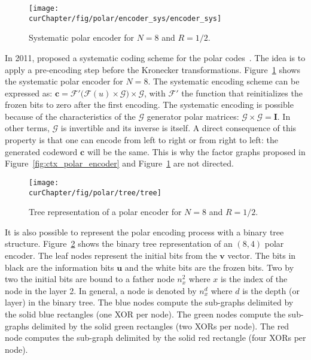 \begin{figure}[htp]
  \centering
  \texttt{[image: \\curChapter/fig/polar/encoder\_sys/encoder\_sys]}
  \caption{Systematic polar encoder for $N = 8$ and $R = 1/2$.}
  \label{fig:ctx_polar_encoder_sys}
\end{figure}

In 2011, \Arikan proposed a systematic coding scheme for the polar
codes~\cite{Arikan2011}. The idea is to apply a pre-encoding step before the
Kronecker transformations. Figure~\ref{fig:ctx_polar_encoder_sys} shows the
systematic polar encoder for $N = 8$. The systematic encoding scheme can be
expressed as: $\bm{c} = \mathcal{F'}\big(\mathcal{F}(u) \times
\bm{\mathcal{G}}\big) \times \bm{\mathcal{G}}$, with $\mathcal{F'}$ the function
that reinitializes the frozen bits to zero after the first encoding. The
systematic encoding is possible because of the characteristics of the
$\bm{\mathcal{G}}$ generator polar matrices: $\bm{\mathcal{G}} \times
\bm{\mathcal{G}} = \bm{I}$. In other terms, $\bm{\mathcal{G}}$ is invertible and
its inverse is itself. A direct consequence of this property is that one can
encode from left to right or from right to left: the generated codeword $\bm{c}$
will be the same. This is why the factor graphs proposed in
Figure~\ref{fig:ctx_polar_encoder} and Figure~\ref{fig:ctx_polar_encoder_sys}
are not directed.

\begin{figure}[htp]
  \centering
  \texttt{[image: \\curChapter/fig/polar/tree/tree]}
  \caption{Tree representation of a polar encoder for $N = 8$ and $R = 1/2$.}
  \label{fig:ctx_polar_tree}
\end{figure}

It is also possible to represent the polar encoding process with a binary tree
structure. Figure~\ref{fig:ctx_polar_tree} shows the binary tree representation
of an $(8,4)$ polar encoder. The leaf nodes represent the initial bits from the
$\bm{v}$ vector. The bits in black are the information bits $\bm{u}$ and the
white bits are the frozen bits. Two by two the initial bits are bound to a
father node $n_x^2$ where $x$ is the index of the node in the layer 2. In
general, a node is denoted by $n_x^d$ where $d$ is the depth (or layer) in the
binary tree. The {\color{Paired-1} blue} nodes compute the sub-graphs delimited
by the solid {\color{Paired-1} blue} rectangles (one XOR per node). The
{\color{Paired-3} green} nodes compute the sub-graphs delimited by the solid
{\color{Paired-3} green} rectangles (two XORs per node). The {\color{Paired-5}
red} node computes the sub-graph delimited by the solid {\color{Paired-5} red}
rectangle (four XORs per node).


